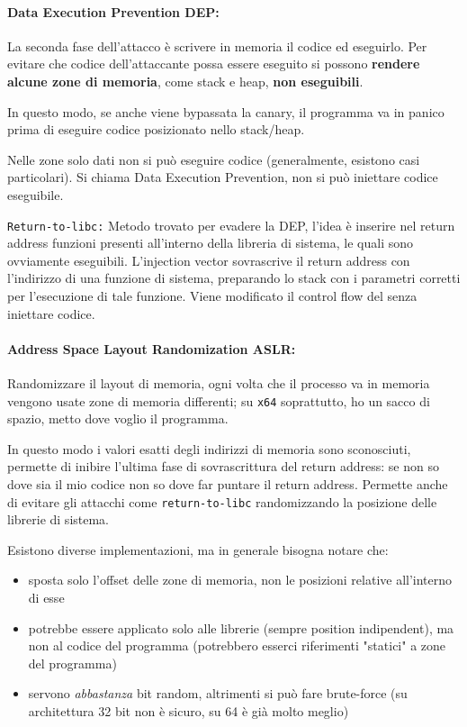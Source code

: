 \paragraph{Data Execution Prevention DEP:} La seconda fase dell'attacco è scrivere in memoria il codice ed eseguirlo. Per evitare che codice dell'attaccante possa essere eseguito si possono \textbf{rendere alcune zone di memoria}, come stack e heap, \textbf{non eseguibili}. 

In questo modo, se anche viene bypassata la canary, il programma va in panico prima di eseguire codice posizionato nello stack/heap. 

Nelle zone solo dati non si può eseguire codice (generalmente, esistono casi particolari). Si chiama Data Execution Prevention, non si può iniettare codice eseguibile.

\texttt{Return-to-libc:} Metodo trovato per evadere la DEP, l'idea è inserire nel return address funzioni presenti all'interno della libreria di sistema, le quali sono ovviamente eseguibili. L'injection vector sovrascrive il return address con l'indirizzo di una funzione di sistema, preparando lo stack con i parametri corretti per l'esecuzione di tale funzione. Viene modificato il control flow del senza iniettare codice.

\paragraph{Address Space Layout Randomization ASLR:} Randomizzare il layout di memoria, ogni volta che il processo va in memoria vengono usate zone di memoria differenti; su \texttt{x64} soprattutto, ho un sacco di spazio, metto dove voglio il programma. 

In questo modo i valori esatti degli indirizzi di memoria sono sconosciuti, permette di inibire l'ultima fase di sovrascrittura del return address: se non so dove sia il mio codice non so dove far puntare il return address. Permette anche di evitare gli attacchi come \texttt{return-to-libc} randomizzando la posizione delle librerie di sistema.

Esistono diverse implementazioni, ma in generale bisogna notare che:
\begin{itemize}
	\item sposta solo l'offset delle zone di memoria, non le posizioni relative all'interno di esse

	\item potrebbe essere applicato solo alle librerie (sempre position indipendent), ma non al codice del programma (potrebbero esserci riferimenti "statici" a zone del programma)

	\item servono \textit{abbastanza} bit random, altrimenti si può fare brute-force (su architettura 32 bit non è sicuro, su 64 è già molto meglio)
\end{itemize}

